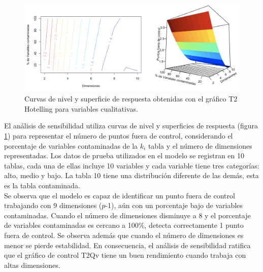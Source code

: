 \documentclass[water,article,submit,moreauthors,pdftex]{mdpi}
\begin{document}
\begin{figure}[!ht]



\begin{center}\includegraphics[width=0.8\linewidth,]{conjuntosensibilidad} \end{center}

\caption{Curvas de nivel y superficie de respuesta obtenidas con el gráfico T2 Hotelling para variables cualitativas.}

\label{fig:sensibilidad}
\end{figure}

El análisis de sensibilidad utiliza curvas de nivel y superficies de
respuesta (figura \ref{fig:sensibilidad}) para representar el número de
puntos fuera de control, considerando el porcentaje de variables
contaminadas de la \(k_i\) tabla y el número de dimensiones
representadas. Los datos de prueba utilizados en el modelo se registran
en 10 tablas, cada una de ellas incluye 10 variables y cada variable
tiene tres categorías: alto, medio y bajo. La tabla 10 tiene una
distribución diferente de las demás, esta es la tabla contaminada.\\
Se observa que el modelo es capaz de identificar un punto fuera de
control trabajando con 9 dimensiones (\(p\)-1), aún con un porcentaje
bajo de variables contaminadas. Cuando el número de dimensiones
disminuye a 8 y el porcentaje de variables contaminadas es cercano a
100\%, detecta correctamente 1 punto fuera de control. Se observa además
que cuando el número de dimensiones es menor se pierde estabilidad. En
consecuencia, el análisis de sensibilidad ratifica que el gráfico de
control T2Qv tiene un buen rendimiento cuando trabaja con altas
dimensiones.
\end{document}
